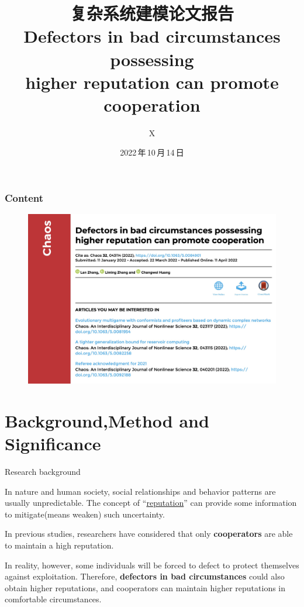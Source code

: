 \documentclass[notheorems,11pt,compress]{beamer}
\title[复杂系统建模论文报告]{复杂系统建模论文报告
	\\[8pt] Defectors in bad circumstances possessing
	\\[5pt] higher reputation can promote cooperation}
\author[X]{X}
\institute[DLUT]{\vskip -10pt
	\small {大连理工大学数学系}
	\vskip 10pt
}
\date[2022.10.14]{2022\,年\,10\,月\,14\,日}
\numberwithin{figure}{section}
\numberwithin{table}{section}
\numberwithin{equation}{section}
\theoremstyle{plain}
\numberwithin{theorem}{section}
\numberwithin{definition}{section}
\numberwithin{lemma}{section}
\numberwithin{proposition}{section}
\numberwithin{corollary}{section}
\theoremstyle{example}
\begin{document}
\setlength{\baselineskip}{15pt}


{%
	\begin{frame}
		\titlepage %
	\end{frame}}


\begin{frame}
	\frametitle{\textbf{Content}}
	\tableofcontents
\end{frame}


\begin{frame}
	\begin{figure}[H]
		\centering
		\includegraphics[width=1\textwidth]{paper}
	\end{figure}
\end{frame}
\section{Background,Method and Significance}

\begin{frame}{Research background}


	In nature and human society, social relationships and behavior patterns are usually unpredictable.
	The concept of ``\underline{reputation}'' can provide some information to mitigate(means weaken) such uncertainty.

	\vspace{1ex}

	In previous studies, researchers have considered that only \textbf{cooperators} are able to maintain a high reputation.

	In reality, however, some individuals will be forced to defect to protect themselves against exploitation.
	Therefore, \textbf{defectors in bad circumstances} could also obtain higher reputations, and cooperators can maintain higher reputations in comfortable circumstances.

\end{frame}
\end{document}
